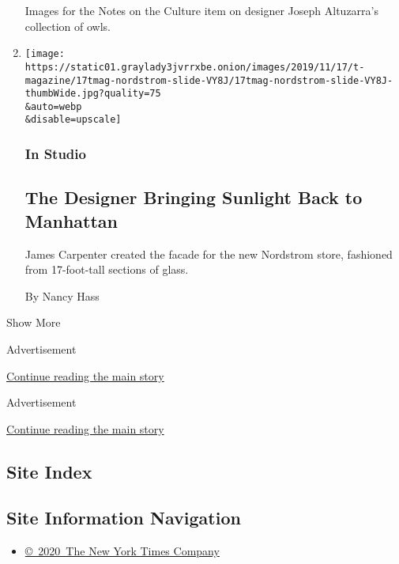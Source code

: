 \begin{enumerate}
  Images for the Notes on the Culture item on designer Joseph
  Altuzarra's collection of owls.
\item
  \href{/2019/11/07/t-magazine/james-carpenter-designer.html}{}

  \texttt{[image: https://static01.graylady3jvrrxbe.onion/images/2019/11/17/t-magazine/17tmag-nordstrom-slide-VY8J/17tmag-nordstrom-slide-VY8J-thumbWide.jpg?quality=75\\\&auto=webp\\\&disable=upscale]}

  \hypertarget{in-studio}{%
  \subsubsection{In Studio}\label{in-studio}}

  \hypertarget{the-designer-bringing-sunlight-back-to-manhattan}{%
  \subsection{The Designer Bringing Sunlight Back to
  Manhattan}\label{the-designer-bringing-sunlight-back-to-manhattan}}

  James Carpenter created the facade for the new Nordstrom store,
  fashioned from 17-foot-tall sections of glass.

  By Nancy Hass
\end{enumerate}

Show More

Advertisement

\protect\hyperlink{after-mid2}{Continue reading the main story}

Advertisement

\protect\hyperlink{after-mktg}{Continue reading the main story}

\hypertarget{site-index}{%
\subsection{Site Index}\label{site-index}}

\hypertarget{site-information-navigation}{%
\subsection{Site Information
Navigation}\label{site-information-navigation}}

\begin{itemize}
\tightlist
\item
  \href{https://help.nytimes3xbfgragh.onion/hc/en-us/articles/115014792127-Copyright-notice}{©~2020~The
  New York Times Company}
\end{itemize}

